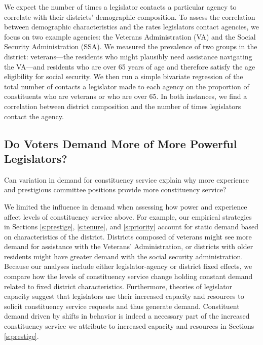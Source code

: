 \documentclass[12pt]{article}
\begin{document}
{We expect the number of times a legislator contacts a particular agency to correlate with their districts' demographic composition. To assess the correlation between demographic characteristics and the rates legislators contact agencies, we focus on two example agencies: the Veterans Administration (VA) and the Social Security Administration (SSA). We measured the prevalence of two groups in the district: veterans---the residents who might plausibly need assistance navigating the VA---and residents who are over 65 years of age and therefore satisfy the age eligibility for social security. We then run a simple bivariate regression of the total number of contacts a legislator made to each agency on the proportion of constituents who are veterans or who are over 65.  
In both instances, we find a correlation between district composition and the number of times legislators contact the agency. 



\subsection{Do Voters Demand More of More Powerful Legislators?}

Can variation in demand for constituency service explain why more experience and prestigious committee positions provide more constituency service? 

We limited the influence in demand when assessing how power and experience affect levels of constituency service above. For example, our empirical strategies in Sections \ref{s:prestige}, \ref{s:tenure}, and \ref{s:priority} account for static demand based on characteristics of the district. Districts composed of veterans might see more demand for assistance with the Veterans' Administration, or districts with older residents might have greater demand with the social security administration. Because our analyses include either legislator-agency or district fixed effects, we compare how the levels of constituency service change holding constant demand related to fixed district characteristics. Furthermore, theories of legislator capacity suggest that legislators use their increased capacity and resources to solicit constituency service requests and thus generate demand. Constituent demand driven by shifts in behavior is indeed a necessary part of the increased constituency service we attribute to increased capacity and resources in Sections \ref{s:prestige}.

}
\end{document}
